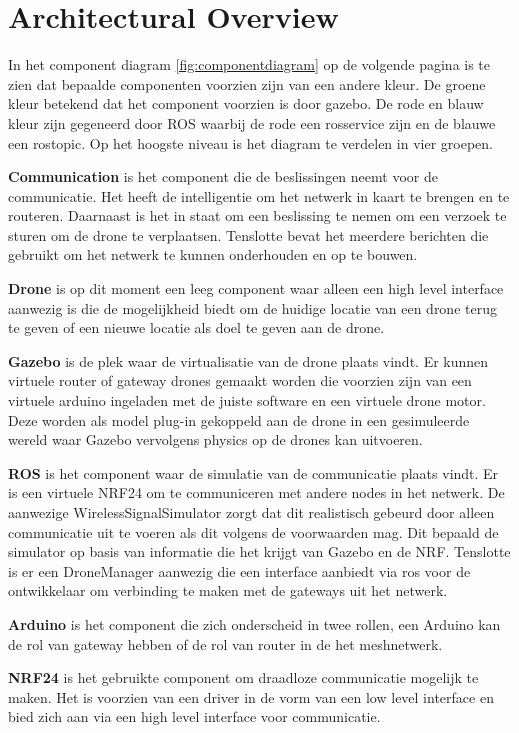 \documentclass[a4paper, 11pt, oneside]{report}
\begin{document}
\chapter{Architectural Overview}
\label{architectural}
In het component diagram \autoref{fig:componentdiagram} op de volgende pagina is te zien dat bepaalde componenten voorzien zijn van een andere kleur. 
De groene kleur betekend dat het component voorzien is door gazebo.
De rode en blauw kleur zijn gegeneerd door ROS waarbij de rode een rosservice zijn en de blauwe een rostopic.
Op het hoogste niveau is het diagram te verdelen in vier groepen.

\textbf{Communication} is het component die de beslissingen neemt voor de communicatie.
Het heeft de intelligentie om het netwerk in kaart te brengen en te routeren.
Daarnaast is het in staat om een beslissing te nemen om een verzoek te sturen om de drone te verplaatsen.
Tenslotte bevat het meerdere berichten die gebruikt om het netwerk te kunnen onderhouden en op te bouwen.    

\textbf{Drone} is op dit moment een leeg component waar alleen een high level interface aanwezig is die de mogelijkheid biedt om de huidige locatie van een drone terug te geven of een nieuwe locatie als doel te geven aan de drone. 

\textbf{Gazebo} is de plek waar de virtualisatie van de drone plaats vindt.
Er kunnen virtuele router of gateway drones gemaakt worden die voorzien zijn van een virtuele arduino ingeladen met de juiste software en een virtuele drone motor.
Deze worden als model plug-in gekoppeld aan de drone in een gesimuleerde wereld waar Gazebo vervolgens physics op de drones kan uitvoeren. 

\textbf{ROS} is het component waar de simulatie van de communicatie plaats vindt.
Er is een virtuele NRF24 om te communiceren met andere nodes in het netwerk.
De aanwezige WirelessSignalSimulator zorgt dat dit realistisch gebeurd door alleen communicatie uit te voeren als dit volgens de voorwaarden mag.
Dit bepaald de simulator op basis van informatie die het krijgt van Gazebo en de NRF.
Tenslotte is er een DroneManager aanwezig die een interface aanbiedt via ros voor de ontwikkelaar om verbinding te maken met de gateways uit het netwerk.

\textbf{Arduino} is het component die zich onderscheid in twee rollen, een Arduino kan de rol van gateway hebben of de rol van router in de het meshnetwerk.

\textbf{NRF24} is het gebruikte component om draadloze communicatie mogelijk te maken. Het is voorzien van een driver in de vorm van een low level interface en bied zich aan via een high level interface voor communicatie.
\end{document}
